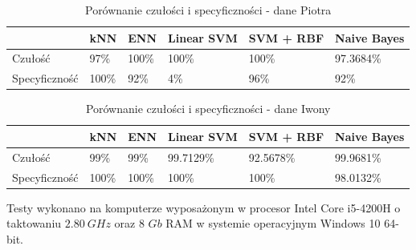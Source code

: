 \documentclass[[10pt,a4paper]{article}
\begin{document}
\begin{table}[h]
\centering
\caption{Porównanie czułości i specyficzności - dane Piotra}
\label{sens1}
\begin{tabular}{|l|l|l|l|l|l|}
\hline
              & kNN & ENN & Linear SVM & SVM + RBF & Naive Bayes \\ \hline
Czułość       &  97\%  & 100\%  &    100\%    &    100\%   &      97.3684\%      \\ \hline
Specyficzność &   100\%   &  92\%   &     4\%       &     96\%   &       92\%      \\ \hline
\end{tabular}
\end{table}


\begin{table}[h]
\centering
\caption{Porównanie czułości i specyficzności - dane Iwony}
\label{sens2}
\begin{tabular}{|l|l|l|l|l|l|}
\hline
              & kNN & ENN & Linear SVM & SVM + RBF & Naive Bayes \\ \hline
Czułość       &  99\%   &  99\%   &    99.7129\%        &     92.5678\%       &   99.9681\%          \\ \hline
Specyficzność &  100\%   &  100\%   &     100\%       &      100\%     &   98.0132\%          \\ \hline
\end{tabular}
\end{table}



Testy wykonano na komputerze wyposażonym w procesor Intel Core i5-4200H o taktowaniu $2.80 \: GHz$ oraz 8 $Gb$ RAM w systemie operacyjnym Windows 10 64-bit.
\end{document}
